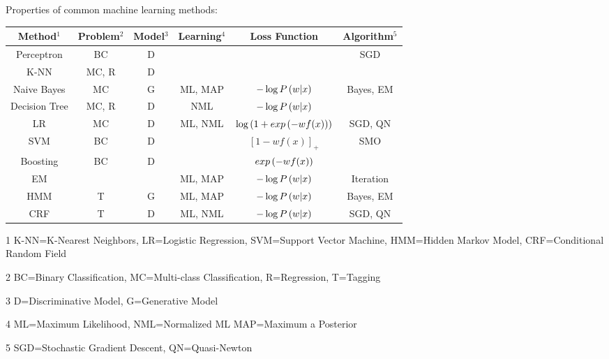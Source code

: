 Properties of common machine learning methods:
\begin{table*}[!h]
	\centering
	\begin{threeparttable}
		\begin{tabular}{|c|c|c|c|c|c|}
			\hline
			Method$^1$ & Problem$^2$ & Model$^3$ & Learning$^4$ & Loss Function & Algorithm$^5$ \\
			\hline
			Perceptron & BC & D & & & SGD \\
			\hline
			K-NN & MC, R & D & & & \\
			\hline
			Naive Bayes & MC & G & ML, MAP & $-\log\P{w|x}$ & Bayes, EM \\
			\hline
			Decision Tree & MC, R & D & NML & $-\log\P{w|x}$ & \\
			\hline
			LR & MC & D & ML, NML & $\log\left(1+\e{-wf(x)}\right)$ & SGD, QN \\
			\hline
			SVM & BC & D & & $\left[1-wf(x)\right]_+$ & SMO \\
			\hline
			Boosting & BC & D & & $\e{-wf(x)}$ & \\
			\hline
			EM & & & ML, MAP & $-\log\P{w|x}$ & Iteration \\
			\hline
			HMM & T & G & ML, MAP & $-\log\P{w|x}$ & Bayes, EM \\
			\hline
			CRF & T & D & ML, NML & $-\log\P{w|x}$ & SGD, QN \\
			\hline
		\end{tabular}
		\begin{tablenotes}
			\small
			\item[1] K-NN=K-Nearest Neighbors, LR=Logistic Regression, SVM=Support Vector Machine, HMM=Hidden Markov Model, CRF=Conditional Random Field
			\item[2] BC=Binary Classification, MC=Multi-class Classification, R=Regression, T=Tagging
			\item[3] D=Discriminative Model, G=Generative Model
			\item[4] ML=Maximum Likelihood, NML=Normalized ML MAP=Maximum a Posterior
			\item[5] SGD=Stochastic Gradient Descent, QN=Quasi-Newton
		\end{tablenotes}
	\end{threeparttable}
\end{table*}

